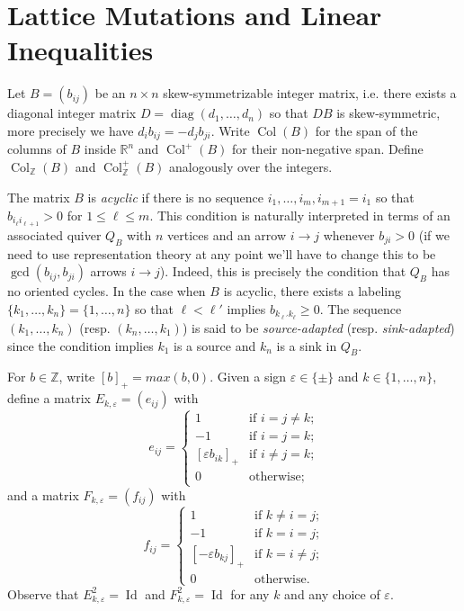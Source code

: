 \documentclass{amsart}
\numberwithin{theorem}{section}
\newcommand{\RR}{\mathbb{R}}
\newcommand{\ZZ}{\mathbb{Z}}
\newcommand{\Col}{\operatorname{Col}}
\newcommand{\diag}{\operatorname{diag}}
\newcommand{\Id}{\operatorname{Id}}
\begin{document}
  \section{Lattice Mutations and Linear Inequalities}
  Let $B=(b_{ij})$ be an $n\times n$ skew-symmetrizable integer matrix, i.e. there exists a diagonal integer matrix $D=\diag(d_1,\ldots,d_n)$ so that $DB$ is skew-symmetric, more precisely we have $d_i b_{ij}=-d_j b_{ji}$.
  Write $\Col(B)$ for the span of the columns of $B$ inside $\RR^n$ and $\Col^+(B)$ for their non-negative span.
  Define $\Col_\ZZ(B)$ and $\Col^+_\ZZ(B)$ analogously over the integers.

  The matrix $B$ is \emph{acyclic} if there is no sequence $i_1,\ldots,i_m,i_{m+1}=i_1$ so that $b_{i_\ell i_{\ell+1}}>0$ for $1\le\ell\le m$.
  This condition is naturally interpreted in terms of an associated quiver $Q_B$ with $n$ vertices and an arrow $i\to j$ whenever $b_{ji}>0$ (if we need to use representation theory at any point we'll have to change this to be $\gcd(b_{ij},b_{ji})$ arrows $i\to j$).
  Indeed, this is precisely the condition that $Q_B$ has no oriented cycles.
  In the case when $B$ is acyclic, there exists a labeling $\{k_1,\ldots,k_n\}=\{1,\ldots,n\}$ so that $\ell<\ell'$ implies $b_{k_{\ell'} k_\ell}\ge 0$.
  The sequence $(k_1,\ldots,k_n)$ (resp. $(k_n,\ldots,k_1)$) is said to be \emph{source-adapted} (resp. \emph{sink-adapted}) since the condition implies $k_1$ is a source and $k_n$ is a sink in $Q_B$.

  For $b\in\ZZ$, write $[b]_+=max(b,0)$.
  Given a sign $\varepsilon\in\{\pm\}$ and $k\in\{1,\ldots,n\}$, define a matrix $E_{k,\varepsilon}=(e_{ij})$ with
  \begin{equation}
    \label{eq:left mutation matrix}
    e_{ij}=\begin{cases} 1 & \text{if $i=j\ne k$;}\\ -1 & \text{if $i=j=k$;}\\ [\varepsilon b_{ik}]_+ & \text{if $i\ne j=k$;}\\ 0 & \text{otherwise;} \end{cases}
  \end{equation}
  and a matrix $F_{k,\varepsilon}=(f_{ij})$ with
  \begin{equation}
    \label{eq:right mutation matrix}
    f_{ij}=\begin{cases} 1 & \text{if $k\ne i=j$;}\\ -1 & \text{if $k=i=j$;}\\ [-\varepsilon b_{kj}]_+ & \text{if $k=i\ne j$;}\\ 0 & \text{otherwise.} \end{cases}
  \end{equation}
  Observe that $E^2_{k,\varepsilon}=\Id$ and $F^2_{k,\varepsilon}=\Id$ for any $k$ and any choice of $\varepsilon$.
\end{document}
